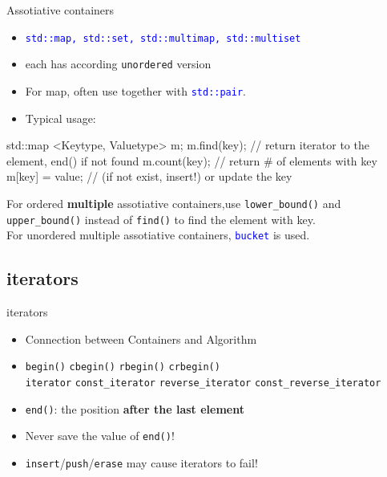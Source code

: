 \documentclass{beamer}
\newcommand{\blue}[1]{\textcolor{blue}{#1}}
\renewcommand{\bf}[1]{\textbf{#1}}
\newcommand{\ttt}[1]{\texttt{#1}}
\newcommand{\bluett}[1]{\blue{\ttt{#1}}}
\begin{document}
\begin{frame}[fragile]{Assotiative containers}
    \begin{itemize}
        \item \bluett{std::map, std::set, std::multimap, std::multiset}
        \item each has according \ttt{unordered} version
        \item For map, often use together with \bluett{std::pair}.
        \item Typical usage:
    \end{itemize}
    \begin{cpp}
std::map <Keytype, Valuetype> m;
m.find(key); // return iterator to the element, end() if not found
m.count(key); // return # of elements with key
m[key] = value; // (if not exist, insert!) or update the key
    \end{cpp}
    For ordered \bf{multiple} assotiative containers,use \ttt{lower\_bound()} and \ttt{upper\_bound()} instead of \ttt{find()} to find the element with key.\\
    For unordered multiple assotiative containers, \bluett{bucket} is used.
\end{frame}

\subsection{iterators}

\begin{frame}{iterators}
    \begin{itemize}
        \item Connection between Containers and Algorithm
        \item \ttt{begin()} \ttt{cbegin()} \ttt{rbegin()} \ttt{crbegin()}\\
        \ttt{iterator} \ttt{const\_iterator} \ttt{reverse\_iterator} \ttt{const\_reverse\_iterator}
        \item \ttt{end()}: the position \bf{after the last element}
        \item Never save the value of \ttt{end()}!
        \item \ttt{insert}/\ttt{push}/\ttt{erase} may cause iterators to fail!
    \end{itemize}
\end{frame}
\end{document}
